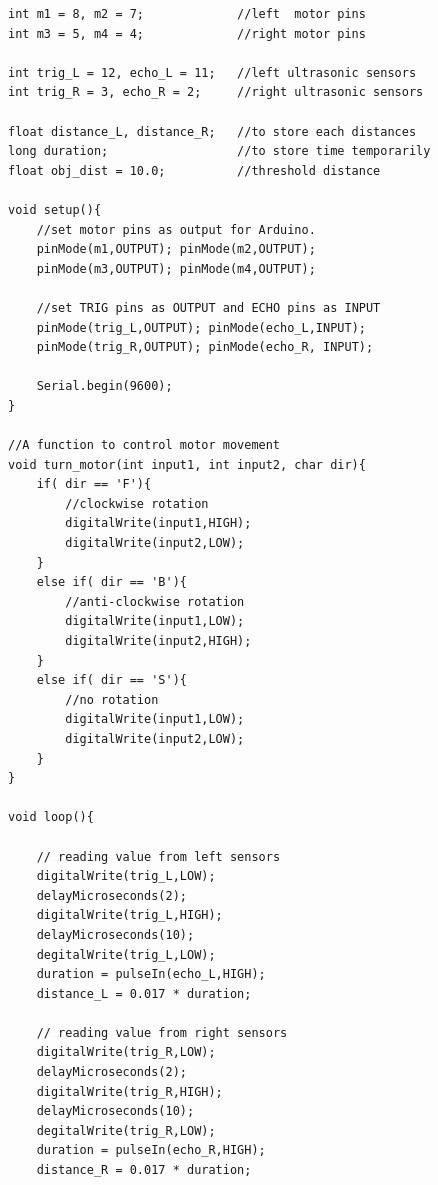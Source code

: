 \begin{lstlisting}[style=CStyle]
int m1 = 8, m2 = 7;             //left  motor pins
int m3 = 5, m4 = 4;             //right motor pins

int trig_L = 12, echo_L = 11;   //left ultrasonic sensors
int trig_R = 3, echo_R = 2;     //right ultrasonic sensors

float distance_L, distance_R;   //to store each distances
long duration;                  //to store time temporarily
float obj_dist = 10.0;          //threshold distance

void setup(){
    //set motor pins as output for Arduino.
    pinMode(m1,OUTPUT); pinMode(m2,OUTPUT);
    pinMode(m3,OUTPUT); pinMode(m4,OUTPUT);
    
    //set TRIG pins as OUTPUT and ECHO pins as INPUT
    pinMode(trig_L,OUTPUT); pinMode(echo_L,INPUT);
    pinMode(trig_R,OUTPUT); pinMode(echo_R, INPUT);
    
    Serial.begin(9600);
}

//A function to control motor movement
void turn_motor(int input1, int input2, char dir){
    if( dir == 'F'){
        //clockwise rotation
        digitalWrite(input1,HIGH);
        digitalWrite(input2,LOW);
    }
    else if( dir == 'B'){
        //anti-clockwise rotation
        digitalWrite(input1,LOW);
        digitalWrite(input2,HIGH);
    }
    else if( dir == 'S'){
        //no rotation
        digitalWrite(input1,LOW);
        digitalWrite(input2,LOW);
    }
}

void loop(){
    
    // reading value from left sensors
    digitalWrite(trig_L,LOW);
    delayMicroseconds(2);
    digitalWrite(trig_L,HIGH);
    delayMicroseconds(10);
    degitalWrite(trig_L,LOW);
    duration = pulseIn(echo_L,HIGH);
    distance_L = 0.017 * duration;
    
    // reading value from right sensors
    digitalWrite(trig_R,LOW);
    delayMicroseconds(2);
    digitalWrite(trig_R,HIGH);
    delayMicroseconds(10);
    degitalWrite(trig_R,LOW);
    duration = pulseIn(echo_R,HIGH);
    distance_R = 0.017 * duration;
    

\end{lstlisting}
